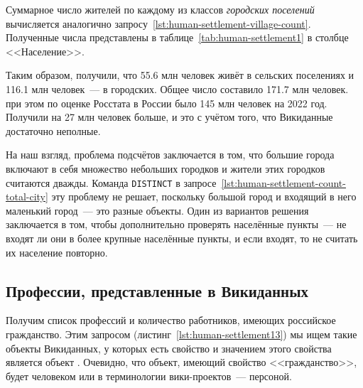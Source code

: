 Суммарное число жителей по каждому из классов \emph{городских поселений} 
вычисляется аналогично запросу~\ref{lst:human-settlement-village-count}. 
Полученные числа представлены в таблице~\ref{tab:human-settlement1} в столбце <<Население>>. 

Таким образом, получили, что \num{55.6} млн человек живёт в сельских поселениях и \num{116.1} млн человек~--- в городских. 
Общее число составило \num{171.7} млн человек. 
при этом по оценке Росстата в России было 145 млн человек на 2022 год. 
Получили на 27 млн человек больше, и это с учётом того, что Викиданные достаточно неполные. 

На наш взгляд, проблема подсчётов заключается в том, 
что большие города включают в себя множество небольших городков и жители этих городков считаются дважды. 
Команда \lstinline|DISTINCT|%
%
%
%
%
в запросе~\ref{lst:human-settlement-count-total-city} 
эту проблему не решает, поскольку большой город и входящий в него маленький город~--- это разные объекты. 
Один из вариантов решения заключается в том, 
чтобы дополнительно проверять населённые пункты~---  
не входят ли они в более крупные населённые пункты, 
и если входят, то не считать их население повторно. 



\subsection{Профессии, представленные в Викиданных}

Получим список профессий и количество работников, 
имеющих российское гражданство. 
Этим запросом (листинг~\ref{lst:human-settlement13}) 
мы ищем такие объекты Викиданных, 
у которых есть свойство  
и значением этого свойства является объект . 
Очевидно, что объект, имеющий свойство <<гражданство>>, будет человеком 
или в терминологии вики-проектов~--- персоной. 



